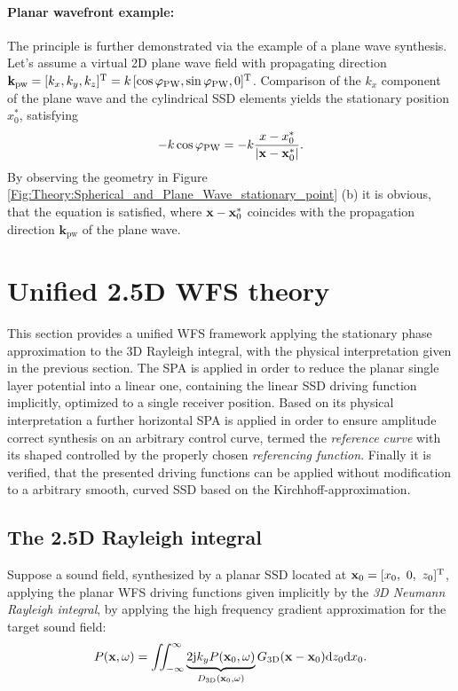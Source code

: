 \paragraph{Planar wavefront example: \\}
The principle is further demonstrated via the example of a plane wave synthesis.
Let's assume a virtual 2D plane wave field with propagating direction $\mathbf{k}_\text{pw}=[k_x,k_y,k_z]^{\mathrm{T}}=k\,[\cos\varphi_\text{PW},\sin\varphi_\text{PW},0]^{\mathrm{T}}$.
Comparison of the $k_x$ component of the plane wave and the cylindrical SSD elements yields the stationary position $x_0^*$, satisfying
\begin{equation}
\label{Eq:Phix0_PlaneWaveExample}
- k \cos\varphi_\text{PW} = -k \frac{x-x_0^*}{|\mathbf{x} - \mathbf{x}_0^*|}.
\end{equation}
By observing the geometry in Figure \ref{Fig:Theory:Spherical_and_Plane_Wave_stationary_point} (b) it is obvious, that the equation is satisfied, where $\mathbf{x}-\mathbf{x}_0^*$ coincides with the propagation direction $\mathbf{k}_\text{pw}$ of the plane wave.


\section{Unified 2.5D WFS theory}
\label{Sec:Unified_WFS}

This section provides a unified WFS framework applying the stationary phase approximation to the 3D Rayleigh integral, with the physical interpretation given in the previous section.
The SPA is applied in order to reduce the planar single layer potential into a linear one, containing the linear SSD driving function implicitly, optimized to a single receiver position.
Based on its physical interpretation a further horizontal SPA is applied in order to ensure amplitude correct synthesis on an arbitrary control curve, termed the \emph{reference curve} with its shaped controlled by the properly chosen \emph{referencing function}.
Finally it is verified, that the presented driving functions can be applied without modification to a arbitrary smooth, curved SSD based on the Kirchhoff-approximation.

\subsection{The 2.5D Rayleigh integral}
Suppose a sound field, synthesized by a planar SSD located at $\mathbf{x}_0 = [x_0,\ 0,\ z_0]^{\mathrm{T}}$, applying the planar WFS driving functions given implicitly by the \emph{3D Neumann Rayleigh integral}, by applying the high frequency gradient approximation for the target sound field:
\begin{equation}
P(\mathbf{x},\omega) = \iint_{-\infty}^{\infty} 
\underbrace{ 2 \mathrm{j} k_y P(\mathbf{x}_0,\omega)}_{ D_{3\mathrm{D}}(\mathbf{x}_0, \omega) }
G_{3\mathrm{D}}(\mathbf{x}-\mathbf{x}_0) \mathrm{d} z_0 \mathrm{d} x_0.
\label{eq:25D_WFS:3D_neumann} 
\end{equation}

